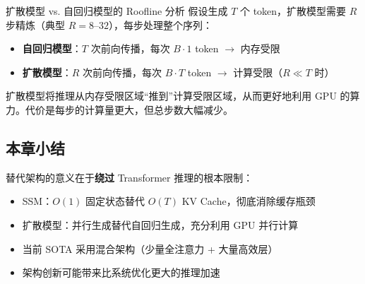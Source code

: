 \begin{knowledgebox}{扩散模型 vs. 自回归模型的 Roofline 分析}
假设生成 $T$ 个 token，扩散模型需要 $R$ 步精炼（典型 $R=8$--$32$），每步处理整个序列：
\begin{itemize}
    \item \textbf{自回归模型}：$T$ 次前向传播，每次 $B \cdot 1$ token $\rightarrow$ 内存受限
    \item \textbf{扩散模型}：$R$ 次前向传播，每次 $B \cdot T$ token $\rightarrow$ 计算受限（$R \ll T$ 时）
\end{itemize}
扩散模型将推理从内存受限区域``推到''计算受限区域，从而更好地利用 GPU 的算力。代价是每步的计算量更大，但总步数大幅减少。
\end{knowledgebox}

\subsection{本章小结}

替代架构的意义在于\textbf{绕过} Transformer 推理的根本限制：
\begin{itemize}
    \item SSM：$O(1)$ 固定状态替代 $O(T)$ KV Cache，彻底消除缓存瓶颈
    \item 扩散模型：并行生成替代自回归生成，充分利用 GPU 并行计算
    \item 当前 SOTA 采用混合架构（少量全注意力 + 大量高效层）
    \item 架构创新可能带来比系统优化更大的推理加速
\end{itemize}


